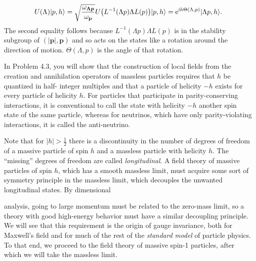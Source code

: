 \begin{equation}
  U(\Lambda)\lvert p,h\rangle=\sqrt{\frac{\omega_{\boldsymbol{\Lambda p}}}{\omega_{\mathbf p}}}
  U\bigl(L^{-1}(\Lambda p)\Lambda L(p)\bigr)\lvert p,h\rangle
  =\mathrm{e}^{\mathrm{i} h\Theta(\Lambda,p)}\lvert \Lambda p,h\rangle.
  \label{eq:4.2}
\end{equation}
The second equality follows because $L^{-1}(\Lambda p)\Lambda L(p)$ is in the stability subgroup of
$(|\mathbf p|,\mathbf p)$ and so acts on the states like a rotation around the direction of motion. $\Theta(\Lambda,p)$
is the angle of that rotation.

In Problem 4.3, you will show that the construction of local fields from the creation
and annihilation operators of massless particles requires that $h$ be quantized in half-
integer multiples and that a particle of helicity $-h$ exists for every particle of helicity $h$.
For particles that participate in parity-conserving interactions, it is conventional to call
the state with helicity $-h$ another spin state of the same particle, whereas for neutrinos,
which have only parity-violating interactions, it is called the anti-neutrino.

Note that for $|h|>\frac12$ there is a discontinuity in the number of degrees of freedom
of a massive particle of spin $h$ and a massless particle with helicity $h$. The ``missing''
degrees of freedom are called \emph{longitudinal}. A field theory of massive particles of spin
$h$, which has a smooth massless limit, must acquire some sort of symmetry principle in
the massless limit, which decouples the unwanted longitudinal states. By dimensional

analysis, going to large momentum must be related to the zero-mass limit, so a theory
with good high-energy behavior must have a similar decoupling principle. We will see
that this requirement is the origin of gauge invariance, both for Maxwell’s field and for
much of the rest of the \emph{standard model} of particle physics. To that end, we proceed to
the field theory of massive spin-1 particles, after which we will take the massless limit.
